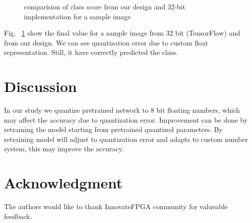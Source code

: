 \documentclass[conference]{IEEEtran}
\begin{document}
\begin{figure} 
    \centering
    \label{1b}
  \caption{comparision of class score from our design and 32-bit implementation for a sample image}
  \label{fig1} 
\end{figure}


Fig. ~\ref{fig1} show the final value for a sample image from 32 bit (TensorFlow) and from our design. We can see quantization error due to custom float representation. Still, it have correctly predicted the class. 



\section{Discussion}
In our study we quantize pretrained network to 8 bit floating numbers, which may affect the accuracy due to quantization error. Improvement can be done by retraining the model starting from pretrained quantized parameters. By retraining model will adjust to quantization error and adapts to custom number system, this may improve the accuracy.

\section*{Acknowledgment}
The authors would like to thank InnovateFPGA community for valueable feedback.



\end{document}

